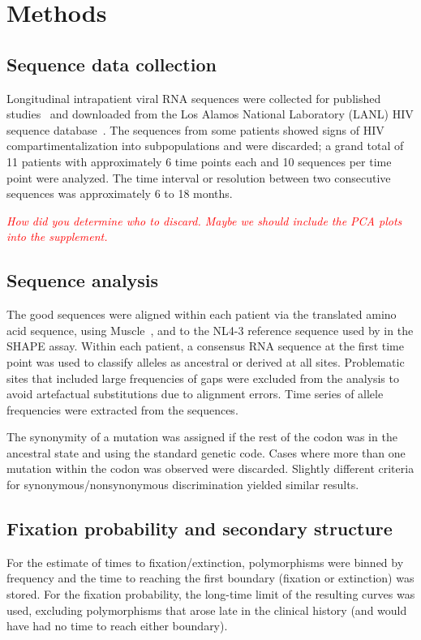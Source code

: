 \documentclass[rmp, twocolumn]{revtex4}
\newcommand{\comment}[1]{\textit{\textcolor{red}{#1}}}
\begin{document}
\section{Methods}
\subsection{Sequence data collection}
Longitudinal intrapatient viral RNA sequences were collected for published
studies~\citep{shankarappa_consistent_1999,
liu_selection_2006, bunnik_autologous_2008} and downloaded from the Los Alamos
National Laboratory (LANL) HIV sequence database~\citep{LANL2012}. The sequences from
some patients showed signs of HIV compartimentalization into subpopulations and
were discarded; a grand total of 11
patients with approximately 6 time points each and 10 sequences per time point
were analyzed. The time interval or resolution between two consecutive sequences
was approximately 6 to 18 months.

\comment{How did you determine who to discard. Maybe we should include the PCA
plots into the supplement.}


\subsection{Sequence analysis}
The good sequences were aligned within each patient
via the translated amino acid sequence, using
Muscle~\citep{edgar_muscle:_2004}, and to the NL4-3 reference sequence used
by \citet{watts_architecture_2009} in the SHAPE assay. Within each patient, a
consensus RNA sequence at the first time point was used to classify alleles as ancestral or
derived at all sites. Problematic sites that included large frequencies of gaps
were excluded from the analysis to avoid artefactual substitutions due to
alignment errors. Time series of allele frequencies were extracted from the
sequences.

The synonymity of a mutation was assigned if the rest of the codon was
in the ancestral state and using the standard genetic code. Cases where more
than one mutation within the codon was observed were discarded. Slightly
different criteria for synonymous/nonsynonymous discrimination yielded similar
results.

\subsection{Fixation probability and secondary structure}
For the estimate of times to fixation/extinction, polymorphisms were
binned by frequency and the time to reaching the first boundary (fixation or
extinction) was stored. For the fixation probability, the long-time limit of the
resulting curves was used, excluding polymorphisms that arose late in the
clinical history (and would have had no time to reach either boundary).
\end{document}
